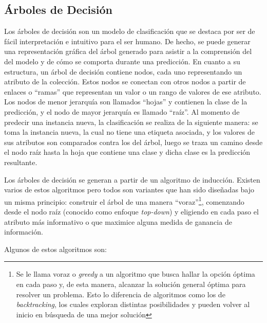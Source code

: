 \subsection{Árboles de Decisión}

Los árboles de decisión son un modelo de clasificación que se destaca por ser de
fácil interpretación e intuitivo para el ser humano. De hecho, se puede generar
una representación gráfica del árbol generado para asistir a la comprensión del
del modelo y de cómo se comporta durante una predicción. En cuanto a su
estructura, un árbol de decisión contiene nodos, cada uno representando un
atributo de la colección. Estos nodos se conectan con otros nodos a partir de
enlaces o “ramas” que representan un valor o un rango de valores de ese
atributo. Los nodos de menor jerarquía son llamados “hojas” y contienen la clase
de la predicción, y el nodo de mayor jerarquía es llamado “raíz”. Al momento de
predecir una instancia nueva, la clasificación se realiza de la siguiente
manera:  se toma la instancia nueva, la cual no tiene una etiqueta asociada, y
los valores de sus atributos son comparados contra los del árbol, luego se traza
un camino desde el nodo raíz hasta la hoja que contiene una clase y dicha clase
es la predicción resultante. 

Los árboles de decisión se generan a partir de un algoritmo de inducción.
Existen varios de estos algoritmos pero todos son variantes que han sido
diseñadas bajo un misma principio: construir  el árbol de una manera
“voraz”\footnote{Se le llama voraz o \textit{greedy} a un algoritmo que busca
   hallar la opción óptima en cada paso y, de esta manera, alcanzar la solución
   general óptima para resolver un problema.  Esto lo diferencia de algoritmos
   como los de \textit{backtracking}, los cuales exploran distintas
posibilidades y pueden volver al inicio en búsqueda de una mejor solución},
comenzando desde el nodo raíz (conocido como enfoque \textit{top-down}) y
eligiendo en cada paso el atributo más informativo o que maximice alguna medida
de ganancia de información. 

Algunos de estos algoritmos son:

